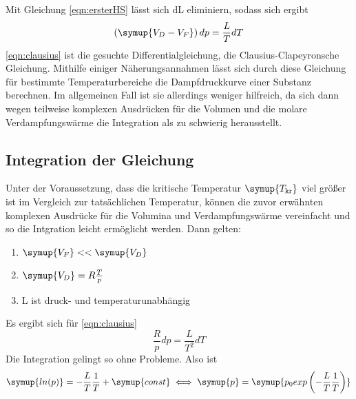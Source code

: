 Mit Gleichung \eqref{eqn:ersterHS} lässt sich dL eliminiern, sodass sich ergibt
\begin{equation}
\left( \symup{ V_D - V_F} \right) dp = \frac{L}{T} dT
\label{eqn:clausius}
\end{equation}
\eqref{eqn:clausius} ist die gesuchte Differentialgleichung, die Clausius-Clapeyronsche
Gleichung. Mithilfe einiger Näherungsannahmen lässt sich durch diese Gleichung
für bestimmte Temperaturbereiche die Dampfdruckkurve einer Substanz berechnen. Im 
allgemeinen Fall ist sie allerdings weniger hilfreich, da sich dann wegen teilweise
komplexen Ausdrücken für die Volumen und die molare Verdampfungswärme die Integration
als zu schwierig herausstellt.

\subsection{Integration der Gleichung}
Unter der Voraussetzung, dass die kritische Temperatur $\symup{T_\text{kr}}$ viel größer
ist im Vergleich zur tatsächlichen Temperatur, können die zuvor erwähnten komplexen
Ausdrücke für die Volumina und Verdampfungswärme vereinfacht und so die Intgration 
leicht ermöglicht werden. Dann gelten:
\begin{enumerate}
    \item $\symup{V_F} << \symup{V_D}$
    \item $\symup{V_D} = R \frac{T}{p}$
    \item L ist druck- und temperaturunabhängig
\end{enumerate}
Es ergibt sich für \eqref{eqn:clausius}
\begin{equation*}
\frac{R}{p} dp = \frac{L}{T^2} dT
\end{equation*}
Die Integration gelingt so ohne Probleme. Also ist
\begin{equation}
\symup{ln(p)} = - \frac{L}{T} \frac{1}{T} + \symup{const}\\
\iff \symup{p} = \symup{p_0 exp \left( - \frac{L}{T} \frac{1}{T} \right)}
\end{equation}

